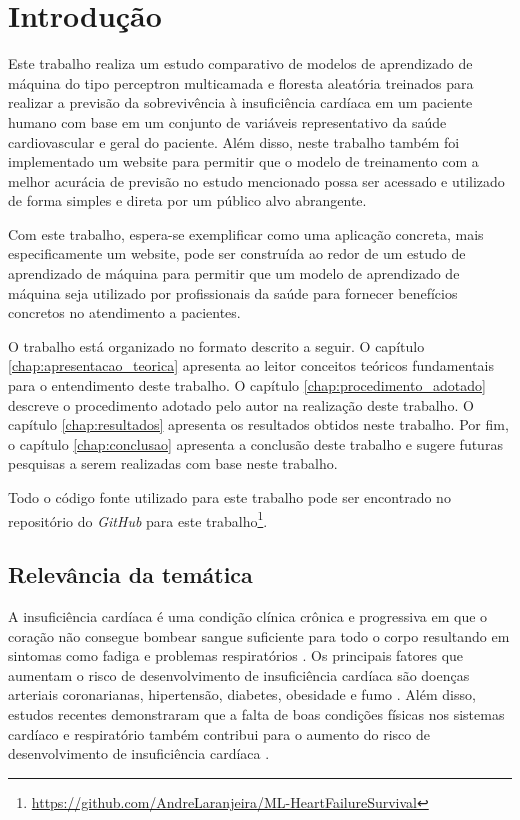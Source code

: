 \chapter{Introdução} \label{chap:introducao}

Este trabalho realiza um estudo comparativo de modelos de aprendizado de máquina do tipo perceptron multicamada e floresta aleatória treinados para realizar a previsão da sobrevivência à insuficiência cardíaca em um paciente humano com base em um conjunto de variáveis representativo da saúde cardiovascular e geral do paciente. Além disso, neste trabalho também foi implementado um website para permitir que o modelo de treinamento com a melhor acurácia de previsão no estudo mencionado possa ser acessado e utilizado de forma simples e direta por um público alvo abrangente.

Com este trabalho, espera-se exemplificar como uma aplicação concreta, mais especificamente um website, pode ser construída ao redor de um estudo de aprendizado de máquina para permitir que um modelo de aprendizado de máquina seja utilizado por profissionais da saúde para fornecer benefícios concretos no atendimento a pacientes.

O trabalho está organizado no formato descrito a seguir. O capítulo \ref{chap:apresentacao_teorica} apresenta ao leitor conceitos teóricos fundamentais para o entendimento deste trabalho. O capítulo \ref{chap:procedimento_adotado} descreve o procedimento adotado pelo autor na realização deste trabalho. O capítulo \ref{chap:resultados} apresenta os resultados obtidos neste trabalho. Por fim, o capítulo \ref{chap:conclusao} apresenta a conclusão deste trabalho e sugere futuras pesquisas a serem realizadas com base neste trabalho.

Todo o código fonte utilizado para este trabalho pode ser encontrado no repositório do \textit{GitHub} para este trabalho\footnote{\url{https://github.com/AndreLaranjeira/ML-HeartFailureSurvival}}.

\section{Relevância da temática}

A insuficiência cardíaca é uma condição clínica crônica e progressiva em que o coração não consegue bombear sangue suficiente para todo o corpo resultando em sintomas como fadiga e problemas respiratórios \cite{heart_failure_definition}. Os principais fatores que aumentam o risco de desenvolvimento de insuficiência cardíaca são doenças arteriais coronarianas, hipertensão, diabetes, obesidade e fumo \cite[p.399]{heart_disease2021}. Além disso, estudos recentes demonstraram que a falta de boas condições físicas nos sistemas cardíaco e respiratório também contribui para o aumento do risco de desenvolvimento de insuficiência cardíaca \cite[p.62]{heart_disease2021}.


